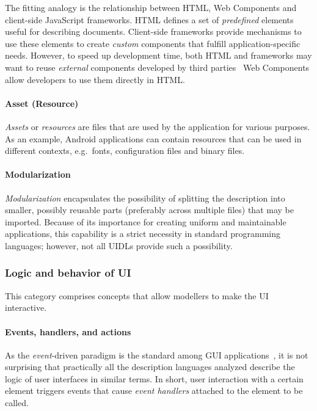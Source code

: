 The fitting analogy is the relationship between HTML, Web Components and client-side JavaScript frameworks.
HTML defines a set of \emph{predefined} elements useful for describing documents.
Client-side frameworks provide mechanisms to use these elements to create \emph{custom} components that fulfill application-specific needs.
However, to speed up development time, both HTML and frameworks may want to reuse \emph{external} components developed by third parties \textendash\ Web Components allow developers to use them directly in HTML\@.

\paragraph{Asset (Resource)}
\emph{Assets} or \emph{resources} are files that are used by the application for various purposes.
As an example, Android applications can contain resources that can be used in different contexts, e.g.\ fonts, configuration files and binary files.

\paragraph{Modularization}
\emph{Modularization} encapsulates the possibility of splitting the description into smaller, possibly reusable parts (preferably across multiple files) that may be imported.
Because of its importance for creating uniform and maintainable applications, this capability is a strict necessity in standard programming languages;
however, not all UIDLs provide such a possibility.

\subsubsection{Logic and behavior of UI}

This category comprises concepts that allow modellers to make the UI interactive.

\paragraph{Events, handlers, and actions}
As the \emph{event}-driven paradigm is the standard among GUI applications~\cite{wang2016event}, it is not surprising that practically all the description languages analyzed describe the logic of user interfaces in similar terms.
In short, user interaction with a certain element triggers events that cause \emph{event handlers} attached to the element to be called.

